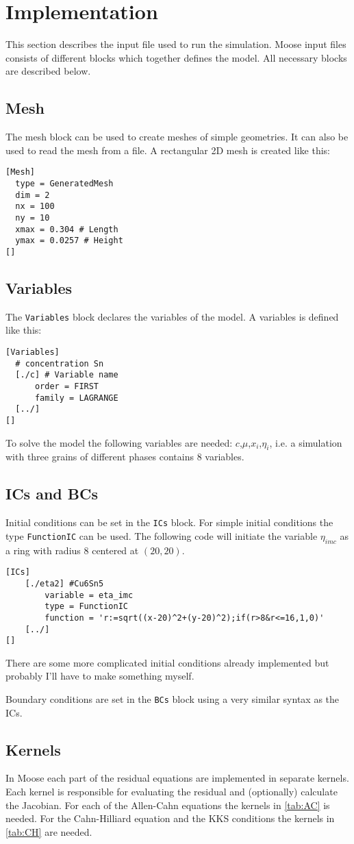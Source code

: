 \documentclass[12pt,a4paper]{article}
\begin{document}
\section{Implementation}
This section describes the input file used to run the simulation.
Moose input files consists of different blocks which together defines the model.
All necessary blocks are described below.
\subsection{Mesh}
The mesh block can be used to create meshes of simple geometries.
It can also be used to read the mesh from a file.
A rectangular 2D mesh is created like this:
\begin{verbatim}
[Mesh]
  type = GeneratedMesh
  dim = 2
  nx = 100
  ny = 10
  xmax = 0.304 # Length 
  ymax = 0.0257 # Height
[]
\end{verbatim}
\subsection{Variables}
The \texttt{Variables} block declares the variables of the model.
A variables is defined like this:
\begin{verbatim}
[Variables]
  # concentration Sn
  [./c] # Variable name
      order = FIRST
      family = LAGRANGE
  [../]
[]
\end{verbatim}
To solve the model the following variables are needed: $c$,$\mu$,$x_i$,$\eta_i$, i.e. a simulation with three grains of different phases contains $8$ variables.
\subsection{ICs and BCs}
Initial conditions can be set in the \texttt{ICs} block. 
For simple initial conditions the type \texttt{FunctionIC} can be used.
The following code will initiate the variable $\eta_{imc}$ as a ring with radius $8$ centered at $(20,20)$.
\begin{verbatim}
[ICs]
    [./eta2] #Cu6Sn5
        variable = eta_imc
        type = FunctionIC
        function = 'r:=sqrt((x-20)^2+(y-20)^2);if(r>8&r<=16,1,0)'
    [../]
[]
\end{verbatim}
There are some more complicated initial conditions already implemented but probably I'll have to make something myself.

Boundary conditions are set in the \texttt{BCs} block using a very similar syntax as the ICs.
\subsection{Kernels}
In Moose each part of the residual equations are implemented in separate kernels. 
Each kernel is responsible for evaluating the residual and (optionally) calculate the Jacobian. 
For each of the Allen-Cahn equations the kernels in \cref{tab:AC} is needed.
For the Cahn-Hilliard equation and the KKS conditions the kernels in \cref{tab:CH} are needed.
\end{document}
